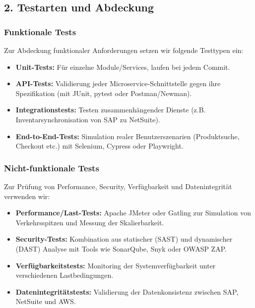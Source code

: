 \subsection{2. Testarten und Abdeckung}

\subsubsection{Funktionale Tests}
Zur Abdeckung funktionaler Anforderungen setzen wir folgende Testtypen ein:
\begin{itemize}
    \item \textbf{Unit-Tests:} Für einzelne Module/Services, laufen bei jedem Commit.
    \item \textbf{API-Tests:} Validierung jeder Microservice-Schnittstelle gegen ihre Spezifikation (mit JUnit, pytest oder Postman/Newman).
    \item \textbf{Integrationstests:} Testen zusammenhängender Dienste (z.B. Inventarsynchronisation von SAP zu NetSuite).
    \item \textbf{End-to-End-Tests:} Simulation realer Benutzerszenarien (Produktsuche, Checkout etc.) mit Selenium, Cypress oder Playwright.
\end{itemize}
\subsubsection{Nicht-funktionale Tests}
Zur Prüfung von Performance, Security, Verfügbarkeit und Datenintegrität verwenden wir:
\begin{itemize}
    \item \textbf{Performance/Last-Tests:} Apache JMeter oder Gatling zur Simulation von Verkehrsspitzen und Messung der Skalierbarkeit.
    \item \textbf{Security-Tests:} Kombination aus statischer (SAST) und dynamischer (DAST) Analyse mit Tools wie SonarQube, Snyk oder OWASP ZAP.
    \item \textbf{Verfügbarkeitstests:} Monitoring der Systemverfügbarkeit unter verschiedenen Lastbedingungen.
    \item \textbf{Datenintegritätstests:} Validierung der Datenkonsistenz zwischen SAP, NetSuite und AWS.
\end{itemize}
